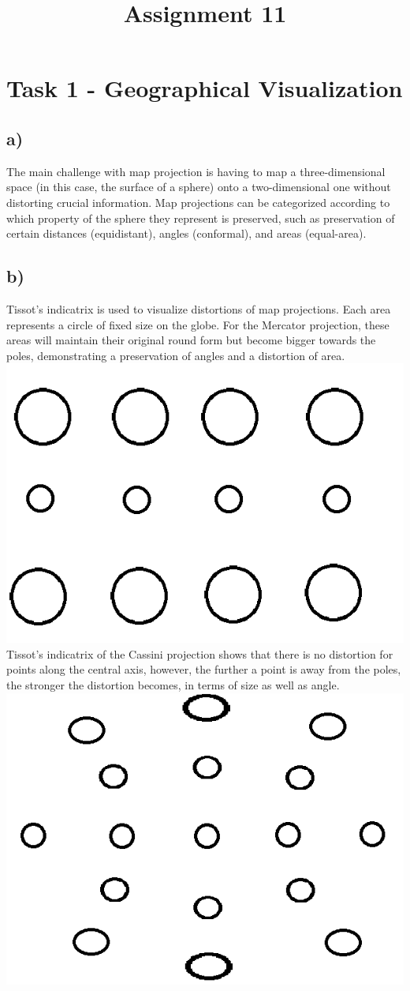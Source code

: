 \documentclass[a4paper]{article}
\date{}
\author{}
\title{\textbf{Assignment 11}}
\begin{document}
\maketitle 
\thispagestyle{fancy}

\section*{Task 1 - Geographical Visualization}
\subsection*{a)} The main challenge with map projection is having to map a three-dimensional space (in this case, the surface of a sphere) onto a two-dimensional one without distorting crucial information. Map projections can be categorized according to which property of the sphere they represent is preserved, such as preservation of certain distances (equidistant), angles (conformal), and areas (equal-area).
\subsection*{b)} Tissot’s indicatrix is used to visualize distortions of map projections. Each area represents a circle of fixed size on the globe. 
For the Mercator projection, these areas will maintain their original round form  but become bigger towards the poles, demonstrating a preservation of angles and a distortion of area.
\includegraphics[width=0.7\linewidth]{Mercator} \\
Tissot’s indicatrix of the Cassini projection shows that there is no distortion for points along the central axis, however, the further a point is away from the poles, the stronger the distortion becomes, in terms of size as well as angle.
\includegraphics[width=0.7\linewidth]{Cassini}\\
\end{document}
